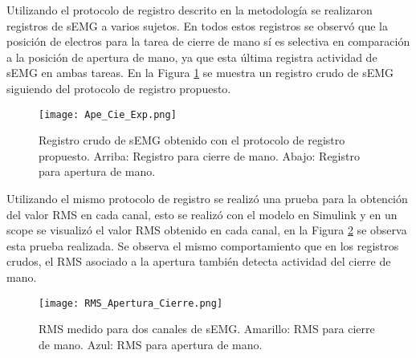 Utilizando el protocolo de registro descrito en la metodología se realizaron registros de sEMG a varios sujetos. En todos estos registros se observó que la posición de electros para la tarea de cierre de mano sí es selectiva en comparación a la posición de apertura de mano, ya que esta última registra actividad de sEMG en ambas tareas. En la Figura \ref{Figura: AC_Exp} se muestra un registro crudo de sEMG siguiendo del protocolo de registro propuesto.

\begin{figure}[htbp]
	\centering
	\texttt{[image: Ape\_Cie\_Exp.png]}
	\caption{Registro crudo de sEMG obtenido con el protocolo de registro propuesto. Arriba: Registro para cierre de mano. Abajo: Registro para apertura de mano.}
	\label{Figura: AC_Exp}
\end{figure}

Utilizando el mismo protocolo de registro se realizó una prueba para la obtención del valor RMS en cada canal, esto se realizó con el modelo en Simulink y en un scope se visualizó el valor RMS obtenido en cada canal, en la Figura \ref{Figura: AC_RMS} se observa esta prueba realizada. Se observa el mismo comportamiento que en los registros crudos, el RMS asociado a la apertura también detecta actividad del cierre de mano.

\begin{figure}[htbp]
	\centering
	\texttt{[image: RMS\_Apertura\_Cierre.png]}
	\caption{RMS medido para dos canales de sEMG. Amarillo: RMS para cierre de mano. Azul: RMS para apertura de mano.}
	\label{Figura: AC_RMS}
\end{figure}